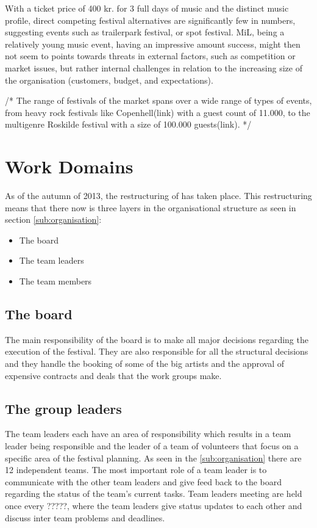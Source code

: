 \bigskip

With a ticket price of 400 kr. for 3 full days of music and the distinct music profile, direct competing festival alternatives are significantly few in numbers, suggesting events such as trailerpark festival, or spot festival. MiL, being a relatively young music event, having an impressive amount success, might then not seem to points towards threats in external factors, such as competition or market issues, but rather internal challenges in relation to the increasing size of the organisation (customers, budget, and expectations). 

\bigskip

/*
The range of festivals of the market spans over a wide range of types of events, from heavy rock festivals like Copenhell(link) with a guest count of 11.000, to the multigenre Roskilde festival with a size of 100.000 guests(link). 
*/


\section{Work Domains}
\label{sec:work_domains}
As of the autumn of 2013, the restructuring of \mil has taken place. This restructuring means
that there now is three layers in the organisational structure as seen in section
\ref{sub:organisation}:
\begin{itemize}
    \item The board
    \item The team leaders
    \item The team members
\end{itemize}
\subsection{The board}
\label{sub:the_board}
The main responsibility of the board is to make all major decisions regarding the execution of the
festival. They are also responsible for all the structural decisions and they handle the booking of
some of the big artists and the approval of expensive contracts and deals that the work groups make.

\subsection{The group leaders}
\label{sub:group_leaders}
The team leaders each have an area of responsibility which results in a team leader being
responsible and the leader of a team of volunteers that focus on a specific area of the festival
planning. As seen in the \ref{sub:organisation} there are 12 independent teams. The most important
role of a team leader is to communicate with the other team leaders and give feed back to the board
regarding the status of the team's current tasks. Team leaders meeting are held once every ?????,
where the team leaders give status updates to each other and discuss inter team problems and
deadlines.

